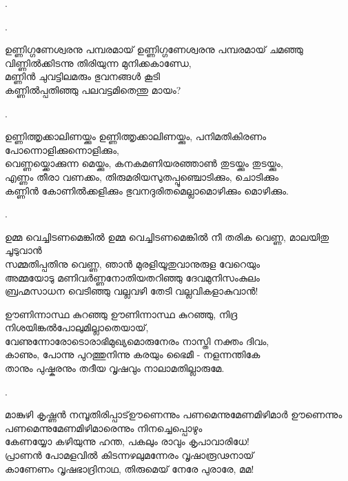 \begin{enumerate}

.

.

\begin{slokam}{\VVt}{\VNM}{ഉണ്ണിഗ്ഗണേശ്വരനു പമ്പരമായ്}
 ഉണ്ണിഗ്ഗണേശ്വരനു പമ്പരമായ് ചമഞ്ഞു \\
വിണ്ണില്‍ക്കിടന്നു തിരിയുന്ന മുനിക്കകാണ്ഡേ, \\
മണ്ണിന്‍ ചുവട്ടിലമരും ഭുവനങ്ങള്‍ കൂടി \\
കണ്ണില്‍പ്പതിഞ്ഞു പലവട്ടമിതെന്തു മായം?
\end{slokam}


.


\begin{slokam}{\VSr}{\KothJ}{ഉണ്ണിത്തൃക്കാലിണയ്ക്കും}
ഉണ്ണിത്തൃക്കാലിണയ്ക്കും, പനിമതികിരണം പോന്നൊളിക്കുന്നൊളിക്കും,\\
വെണ്ണയ്ക്കൊക്കുന്ന മെയ്ക്കും, കനകമണിയരഞ്ഞാൺ തുടയ്ക്കും തുടയ്ക്കും,\\
എണ്ണം തീരാ വണക്കം, തിരുമരിയസുതപ്പൂഞ്ചൊടിക്കും, ചൊടിക്കും\\
കണ്ണിൻ കോണിൽക്കളിക്കും ഭുവനദുരിതമെല്ലാമൊഴിക്കും മൊഴിക്കും.
\end{slokam}


.

\begin{slokam}{\VKm}{\PCM}{ഉമ്മ വെച്ചിടണമെങ്കിൽ}
ഉമ്മ വെച്ചിടണമെങ്കിൽ നീ തരിക വെണ്ണ, മാലയിതു ചൂടുവാൻ\\
സമ്മതിപ്പതിനു വെണ്ണ, ഞാൻ മുരളിയൂതുവാനുരുള വേറെയും\\
അമ്മയോടു മണിവർണ്ണനോതിയതറിഞ്ഞു ദേവമുനിസംകുലം\\
ബ്രഹ്മസാധന വെടിഞ്ഞു വല്ലവഴി തേടി വല്ലവികളാകുവാൻ!
\end{slokam}


\begin{slokam}{\VSv}{\UV}{ഊണിന്നാസ്ഥ കുറഞ്ഞു}
ഊണിന്നാസ്ഥ കുറഞ്ഞു, നിദ്ര നിശയിങ്കൽപോലുമില്ലാതെയായ്‌,\\
വേണുന്നോരോടൊരാഭിമുഖ്യമൊരുനേരം നാസ്തി നക്തം ദിവം,\\
കാണും, പോന്നു പുറത്തുനിന്നു കരയും ഭൈമീ - നളന്നന്തികേ\\
താനും പുഷ്കരനും തദീയ വൃഷവും നാലാമതില്ലാരുമേ. 
\end{slokam}


.

\begin{slokam}{\VSv}{മാങ്കുഴി കൃഷ്ണൻ നമ്പൂതിരിപ്പാട്}{ഊണെന്നും പണമെന്നുമേണമിഴിമാർ}
ഊണെന്നും പണമെന്നുമേണമിഴിമാരെന്നും നിനച്ചെപ്പൊഴും\\
കേണയ്യോ കഴിയുന്നു ഹന്ത, പകലും രാവും കൃപാവാരിധേ! \\
പ്രാണൻ പോമളവിൽ കിടന്നഴലുമന്നേരം വൃഷാരൂഢനായ്\\
കാണേണം വൃഷഭാദ്രിനാഥ,   തിരുമെയ് നേരേ പുരാരേ, മമ!
\end{slokam}


\end{enumerate}

